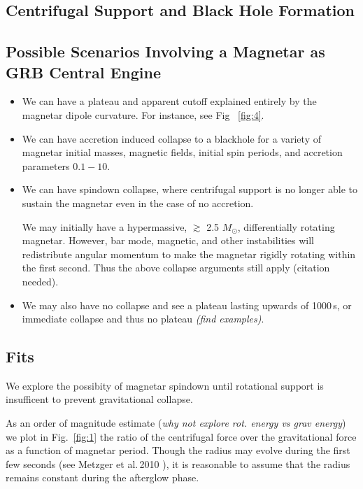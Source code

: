 \documentclass{article}
\begin{document}
\subsection{Centrifugal Support and Black Hole Formation}

\subsection{Possible Scenarios Involving a Magnetar as GRB Central Engine}

\begin{itemize}
\item We can have a plateau and apparent cutoff explained entirely by the magnetar dipole curvature. For instance, see Fig  ~\ref{fig:4}. \newline

\item We can have accretion induced collapse to a blackhole for a variety of magnetar initial masses, magnetic fields, initial spin periods, and accretion parameters $0.1-10$. \newline

\item We can have spindown collapse, where centrifugal support is no longer able to sustain the magnetar even in the case of no accretion. \newline 

We may initially have a hypermassive, $\gtrsim$ 2.5 $M_{\odot}$,  differentially rotating magnetar. However, bar mode, magnetic, and other instabilities will redistribute angular momentum to make the magnetar rigidly rotating within the first second. Thus the above collapse arguments still apply (citation needed). \newline

\item We may also  have no collapse and see a plateau lasting upwards of 1000\,s, or immediate collapse and thus no plateau \textit{(find examples)}.

\end{itemize}
\subsection{Fits}

We explore the possibity of magnetar spindown until rotational support is insufficent to prevent gravitational collapse.

As an order of magnitude estimate (\textit{why not explore rot. energy vs grav energy}) we plot in Fig.~\ref{fig:1} the ratio of the centrifugal force over the gravitational force as a function of magnetar period. Though the radius may evolve during the first few seconds (see Metzger et al.\,2010 \cite{Metzger:2010pp}), it is reasonable to assume that the radius remains constant during the afterglow phase.
\end{document}
